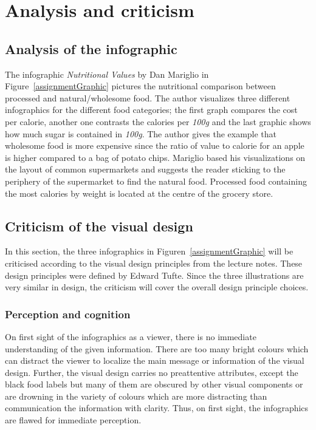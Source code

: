 \section{Analysis and criticism}

\subsection{Analysis of the infographic}

The infographic \textit{Nutritional Values} by Dan Mariglio in
Figure~\ref{assignmentGraphic} pictures the nutritional comparison between
processed and natural/wholesome food. The author visualizes three different
infographics for the different food categories; the first graph compares the
cost per calorie, another one contrasts the calories per \textit{100g} and the
last graphic shows how much sugar is contained in \textit{100g}. The author
gives the example that wholesome food is more expensive since the ratio of value
to calorie for an apple is higher compared to a bag of potato chips. Mariglio
based his visualizations on the layout of common supermarkets and suggests the
reader sticking to the periphery of the supermarket to find the natural food.
Processed food containing the most calories by weight is located at the centre
of the grocery store.

\subsection{Criticism of the visual design}

In this section, the three infographics in Figuren~\ref{assignmentGraphic} will
be criticised according to the visual design principles from the lecture notes.
These design principles were defined by Edward Tufte\cite{Tufte2001}. Since the
three illustrations are very similar in design, the criticism will cover the
overall design principle choices.

\subsubsection{Perception and cognition}


On first sight of the infographics as a viewer, there is no immediate
understanding of the given information. There are too many bright colours which
can distract the viewer to localize the main message or information of the
visual design. Further, the visual design carries no preattentive attributes,
except the black food labels but many of them are obscured by other visual
components or are drowning in the variety of colours which are more distracting
than communication the information with clarity.  Thus, on first sight, the
infographics are flawed for immediate perception.

